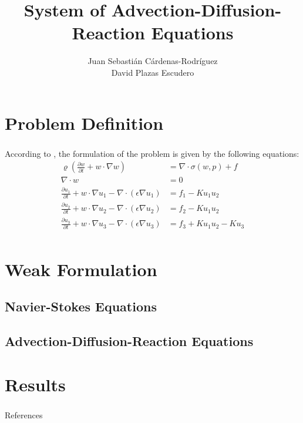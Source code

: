 \documentclass{beamer}
\title{System of Advection-Diffusion-Reaction Equations}
\author{Juan Sebasti\'an C\'ardenas-Rodríguez \\
  David Plazas Escudero\\
  \scalebox{0.7}{Mathematical Engineering, Universidad EAFIT}}
\theoremstyle{definition}
\theoremstyle{remark}
\theoremstyle{example}
\newif\ifinsection
\newif\ifinsubsection
\let\oldsection\section
\renewcommand{\section}{
  \global\insectiontrue
  \global\insubsectionfalse
  \oldsection}
\let\oldsubsection\subsection
\renewcommand{\subsection}{
  \global\insubsectiontrue
  \oldsubsection}
\newcommand {\aframe}[1] {
  \begin{frame}
    \ifinsection\frametitle{\secname}\fi
    \ifinsubsection\framesubtitle{\subsecname}\fi
  #1
  \end{frame}
}
\begin{document}
\begin{frame}[plain]
  \titlepage
\end{frame}



\section{Problem Definition}
\aframe{According to \textcite{langtangen2017}, the formulation of the problem
  is given by the following equations:
  \begin{align*}
    \varrho \left(\frac{\partial w}{\partial t} + w \cdot \nabla w\right)
    &= \nabla \cdot \sigma(w, p) + f \\
    \nabla \cdot w &= 0 \\
    \frac{\partial u_{1}}{\partial t} + w \cdot \nabla u_{1} - \nabla \cdot
    (\epsilon \nabla u_{1}) &= f_{1} - Ku_{1}u_{2} \\
    \frac{\partial u_{2}}{\partial t} + w \cdot \nabla u_{2} - \nabla \cdot
    (\epsilon \nabla u_{2}) &= f_{2} - Ku_{1}u_{2} \\
    \frac{\partial u_{3}}{\partial t} + w \cdot \nabla u_{3} - \nabla \cdot
    (\epsilon \nabla u_{3}) &= f_{3} + Ku_{1}u_{2} - Ku_{3} \\
  \end{align*}
}

\section{Weak Formulation}
\subsection{Navier-Stokes Equations}
\aframe{}

\subsection{Advection-Diffusion-Reaction Equations}
\aframe{}

\section{Results}
\aframe{}

\begin{frame}[allowframebreaks]{References}
  \printbibliography
\end{frame}
\end{document}
